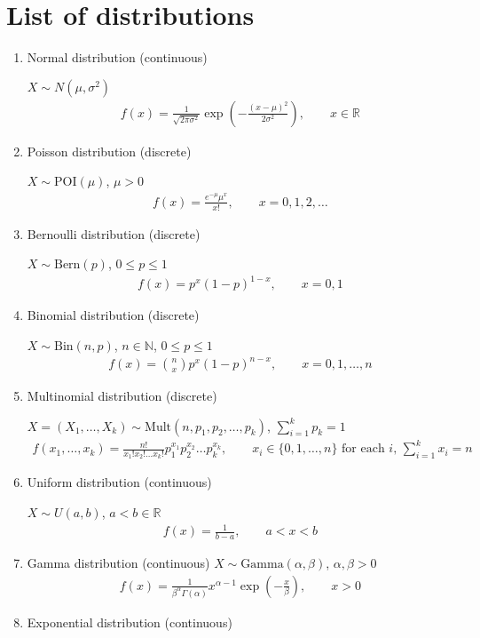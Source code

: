 \documentclass[11pt]{amsart}
\theoremstyle{definition}
\numberwithin{equation}{section}
\begin{document}
\tableofcontents
\newpage

\section{List of distributions}
\begin{enumerate}
    \item Normal distribution (continuous)
    
    $X\sim N(\mu,\sigma^2)$
    \begin{align*}
        f(x)=\frac{1}{\sqrt{2\pi\sigma^2}}\exp\left(-\frac{(x-\mu)^2}{2\sigma^2}\right),\qquad x\in\mathbb R
    \end{align*}
    \item Poisson distribution (discrete)
    
    $X\sim \mathrm{POI}(\mu)$, $\mu>0$
    \begin{align*}
        f(x)=\frac{e^{-\mu}\mu^x}{x!},\qquad x=0,1,2,\ldots
    \end{align*}
    \item Bernoulli distribution (discrete)

    $X\sim\mathrm{Bern}(p)$, $0\le p\le 1$
    \begin{align*}
        f(x)=p^x(1-p)^{1-x},\qquad x=0,1
    \end{align*}
    \item Binomial distribution (discrete)

    $X\sim\mathrm{Bin}(n,p)$, $n\in\mathbb N$, $0\le p\le 1$
    \begin{align*}
        f(x)=\binom{n}{x}p^x(1-p)^{n-x},\qquad x=0,1,\ldots,n
    \end{align*}
    \item Multinomial distribution (discrete)
    
    $X=(X_1,\ldots,X_k)\sim\mathrm{Mult}(n,p_1,p_2,\ldots,p_k)$, $\sum_{i=1}^kp_k=1$
    \begin{align*}
        f(x_1,\ldots,x_k)=\frac{n!}{x_1!x_2!\ldots x_k!}p_1^{x_1}p_2^{x_2}\ldots p_k^{x_k},\qquad x_i\in\{0,1,\ldots,n\}\text{ for each }i,\,\sum_{i=1}^kx_i=n
    \end{align*}
    \item Uniform distribution (continuous)
    
    $X\sim U(a,b)$, $a<b\in\mathbb R$
    \begin{align*}
        f(x)=\frac{1}{b-a},\qquad a<x<b
    \end{align*}
    \item Gamma distribution (continuous)
    $X\sim\mathrm{Gamma}(\alpha,\beta)$, $\alpha,\beta>0$
    \begin{align*}
        f(x)=\frac{1}{\beta^\alpha\Gamma(\alpha)}x^{\alpha-1}\exp(-\frac{x}{\beta}),\qquad x>0
    \end{align*}
    \item Exponential distribution (continuous)


\end{enumerate}
\end{document}
